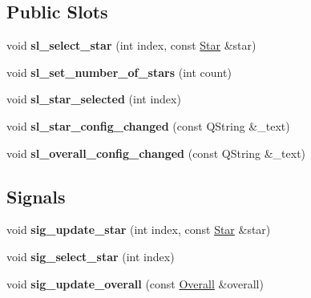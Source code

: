 \subsection*{Public Slots}
\begin{DoxyCompactItemize}
\item 
\mbox{\label{classmgs_1_1StarConfig_a22e5490b5365f563fe1e7e918b860825}} 
void {\bfseries sl\+\_\+select\+\_\+star} (int index, const \hyperlink{structmgs_1_1Star}{Star} \&star)
\item 
\mbox{\label{classmgs_1_1StarConfig_ae630911c36a64a5f5ab0791a50473ad7}} 
void {\bfseries sl\+\_\+set\+\_\+number\+\_\+of\+\_\+stars} (int count)
\item 
\mbox{\label{classmgs_1_1StarConfig_a309fb30037cf8a2bbfb301c7fb826594}} 
void {\bfseries sl\+\_\+star\+\_\+selected} (int index)
\item 
\mbox{\label{classmgs_1_1StarConfig_a9c8eea746149f2b8d0a9cedd3c609802}} 
void {\bfseries sl\+\_\+star\+\_\+config\+\_\+changed} (const Q\+String \&\+\_\+text)
\item 
\mbox{\label{classmgs_1_1StarConfig_a124cf24fbb931a0441374546587eac54}} 
void {\bfseries sl\+\_\+overall\+\_\+config\+\_\+changed} (const Q\+String \&\+\_\+text)
\end{DoxyCompactItemize}
\subsection*{Signals}
\begin{DoxyCompactItemize}
\item 
\mbox{\label{classmgs_1_1StarConfig_a695187db1f613d9c86e8acb19e84e342}} 
void {\bfseries sig\+\_\+update\+\_\+star} (int index, const \hyperlink{structmgs_1_1Star}{Star} \&star)
\item 
\mbox{\label{classmgs_1_1StarConfig_ad16e18ea3ce6269a05726fece52d5207}} 
void {\bfseries sig\+\_\+select\+\_\+star} (int index)
\item 
\mbox{\label{classmgs_1_1StarConfig_a11f05400cd60e2383a6630d5b1b8811e}} 
void {\bfseries sig\+\_\+update\+\_\+overall} (const \hyperlink{structmgs_1_1FieldParmsSimulation}{Overall} \&overall)
\end{DoxyCompactItemize}
